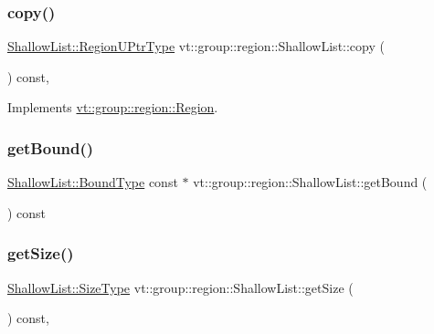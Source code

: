 \subsubsection{\texorpdfstring{copy()}{copy()}}
{\footnotesize\ttfamily \hyperlink{structvt_1_1group_1_1region_1_1_region_ae5f42cf159116a3cf8bd65423eb01037}{Shallow\+List\+::\+Region\+U\+Ptr\+Type} vt\+::group\+::region\+::\+Shallow\+List\+::copy (\begin{DoxyParamCaption}{ }\end{DoxyParamCaption}) const\hspace{0.3cm}{\ttfamily [override]}, {\ttfamily [virtual]}}



Implements \hyperlink{structvt_1_1group_1_1region_1_1_region_a040d20a4f8c6fa351d7fe1cbfcae3a03}{vt\+::group\+::region\+::\+Region}.

\mbox{\label{structvt_1_1group_1_1region_1_1_shallow_list_a3ca4276a7602a1ed44f02dfa7e600e88}} 
\subsubsection{\texorpdfstring{get\+Bound()}{getBound()}}
{\footnotesize\ttfamily \hyperlink{structvt_1_1group_1_1region_1_1_region_abf426ff85bed72c1c6524fad6a9f1751}{Shallow\+List\+::\+Bound\+Type} const  $\ast$ vt\+::group\+::region\+::\+Shallow\+List\+::get\+Bound (\begin{DoxyParamCaption}{ }\end{DoxyParamCaption}) const\hspace{0.3cm}{\ttfamily [virtual]}}

\mbox{\label{structvt_1_1group_1_1region_1_1_shallow_list_a6b8fe82607fdcf88ac33ad387192fbb2}} 
\subsubsection{\texorpdfstring{get\+Size()}{getSize()}}
{\footnotesize\ttfamily \hyperlink{structvt_1_1group_1_1region_1_1_region_a9bb381adf31111aae34dbc644bad6c1f}{Shallow\+List\+::\+Size\+Type} vt\+::group\+::region\+::\+Shallow\+List\+::get\+Size (\begin{DoxyParamCaption}{ }\end{DoxyParamCaption}) const\hspace{0.3cm}{\ttfamily [override]}, {\ttfamily [virtual]}}



